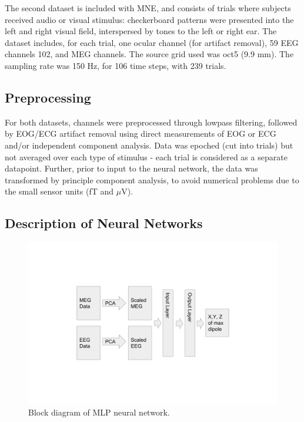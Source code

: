 \documentclass[journal,12pt,onecolumn,draftclsnofoot]{IEEEtran}
\begin{document}
The second dataset \cite{gramfort2013meg} is included with MNE, and consists of trials where subjects received audio or visual stimulus: checkerboard patterns were presented into the left and right visual field, interspersed by tones to the left or right ear. The dataset includes, for each trial, one ocular channel (for artifact removal), 59 EEG channels 102, and MEG channels. The source grid used was oct5 (9.9 mm). The sampling rate was 150 Hz, for 106 time steps, with 239 trials. 

\subsection{Preprocessing}
For both datasets, channels were preprocessed through lowpass filtering, followed by EOG/ECG artifact removal using direct measurements of EOG or ECG and/or independent component analysis. Data was epoched (cut into trials) but not averaged over each type of stimulus - each trial is considered as a separate datapoint. Further, prior to input to the neural network, the data was transformed by principle component analysis, to avoid numerical problems due to the small sensor units (fT and $\mu$V).

\subsection{Description of Neural Networks} 

\begin{figure}[!h]
\centering
\includegraphics[width=5in]{finalplots/mlp}
\caption{Block diagram of MLP neural network.}
\label{fig:mlp}
\end{figure}
\end{document}
